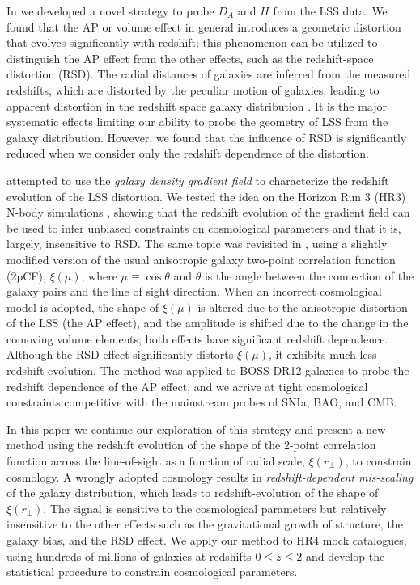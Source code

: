 \documentclass[iop]{emulateapj}
\begin{document}
In \cite{Li2014,Li2015,Li2016} we developed a novel strategy to probe $D_A$ and $H$ from the LSS data.
We found that the AP or volume effect in general introduces a geometric distortion that evolves significantly with redshift;
this phenomenon can be utilized to distinguish the AP effect from the other effects, such as the redshift-space distortion (RSD).
The radial distances of galaxies are inferred from the measured redshifts, which are distorted by the peculiar motion of galaxies, 
leading to apparent distortion in the redshift space galaxy distribution \citep{FOG,Kaiser1987,Ballinger1996}.
It is the major systematic effects limiting our ability to probe the geometry of LSS from the galaxy distribution.
However, we found that the influence of RSD is significantly reduced when we consider only the redshift dependence of the distortion.

\cite{Li2014} attempted to use the {\it galaxy density gradient field} 
to characterize the redshift evolution of the LSS distortion. 
We tested the idea on the Horizon Run 3 (HR3) N-body simulations \citep{horizonrun},
showing that the redshift evolution of the gradient field 
can be used to infer unbiased constraints on cosmological parameters and that it is, largely, insensitive to RSD.
The same topic was revisited in \cite{Li2015}, 
using a slightly modified version of the usual anisotropic galaxy two-point correlation function (2pCF), $\xi(\mu)$, 
where $\mu\equiv \cos \theta$ and $\theta$ is the angle between the connection of the galaxy pairs and the line of sight direction.
When an incorrect cosmological model is adopted, 
the shape of $\xi(\mu)$ is altered due to the anisotropic distortion of the LSS (the AP effect), 
and the amplitude is shifted due to the change in the comoving volume elements;
both effects have significant redshift dependence.
Although the RSD effect significantly distorts $\xi(\mu)$, 
it exhibits much less redshift evolution.
The method was applied to BOSS DR12 galaxies \citep{Li2016} to probe the redshift dependence of the AP effect, 
and we arrive at tight cosmological constraints competitive with the mainstream probes of SNIa, BAO, and CMB.

In this paper we continue our exploration of this strategy and present 
a new method using the redshift evolution of the shape of the 2-point correlation function across the line-of-sight as a function of radial scale, $\xi(r_{\bot})$,
to constrain cosmology.
A wrongly adopted cosmology results in {\it redshift-dependent mis-scaling} of the galaxy distribution,
which leads to redshift-evolution of the shape of $\xi(r_{\bot})$.
The signal is sensitive to the cosmological parameters but relatively insensitive to the other effects such as the gravitational growth of structure,
the galaxy bias, and the RSD effect.
We apply our method to HR4 mock catalogues, using hundreds of millions of galaxies at redshifts $0\leq z\leq2$
and develop the statistical procedure to constrain cosmological parameters.
 
\end{document}
